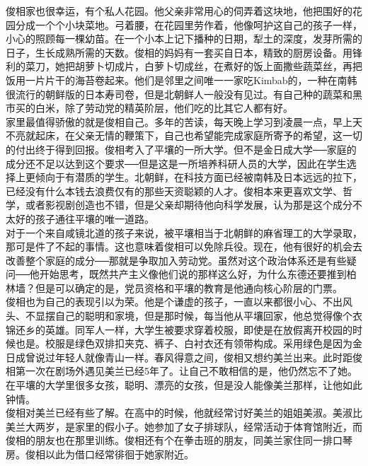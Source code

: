 \begin{multicols}{\theparacolNo}
俊相家也很幸运，有个私人花园。他父亲非常用心的伺弄着这块地，他把围好的花园分成一个个小块菜地。弓着腰，在花园里劳作着，他像呵护这自己的孩子一样，小心的照顾每一棵幼苗。在一个小本上记下播种的日期，犁土的深度，发芽所需的日子，生长成熟所需的天数。俊相的妈妈有一套买自日本，精致的厨房设备。用锋利的菜刀，她把胡萝卜切成片，白萝卜切成丝，在煮好的饭上面撒些蔬菜丝，再把饭用一片片干的海苔卷起来。他们是邻里之间唯一一家吃Kimbab的，一种在南韩很流行的朝鲜版的日本寿司卷，但是北朝鲜人一般没有见过。有自己种的蔬菜和黑市买的白米，除了劳动党的精英阶层，他们吃的比其它人都有好。\\

家里最值得骄傲的就是俊相自己。多年的苦读，每天晚上学习到凌晨一点，早上天不亮就起床，在父亲无情的鞭策下，自己也希望能完成家庭所寄予的希望，这一切的付出终于得到回报。俊相考入了平壤的一所大学。但不是金日成大学──家庭的成分还不足以达到这个要求──但是这是一所培养科研人员的大学，因此在学生选择上更倾向于有潜质的学生。北朝鲜，在科技方面已经被南韩及日本远远的拉下，已经没有什么本钱去浪费仅有的那些天资聪颖的人才。俊相本来更喜欢文学、哲学，或者影视剧创造也不错，但是父亲却期待他向科学发展，认为那是这个成分不太好的孩子通往平壤的唯一道路。\\

对于一个来自咸镜北道的孩子来说，被平壤相当于北朝鲜的麻省理工的大学录取，那可是件了不起的事情。这也意味着俊相可以免除兵役。现在，他有很好的机会去改善整个家庭的成分──那就是争取加入劳动党。虽然对这个政治体系还是有些疑问──他开始思考，既然共产主义像他们说的那样这么好，为什么东德还要推到柏林墙？但是可以确定的是，党员资格和平壤的教育是他通向核心阶层的门票。\\

俊相也为自己的表现引以为荣。他是个谦虚的孩子，一直以来都很小心、不出风头、不显摆自己的聪明和家境，但是那时候，每当他从平壤回家，他总觉得像个衣锦还乡的英雄。同军人一样，大学生被要求穿着校服，即使是在放假离开校园的时候也是。校服是绿色双排扣夹克、裤子、白衬衣还有领带构成。采用绿色是因为金日成曾说过年轻人就像青山一样。春风得意之间，俊相又想约美兰出来。此时距俊相第一次在剧场外遇见美兰已经5年了。让自己不敢相信的是，他仍然忘不了她。在平壤的大学里很多女孩，聪明、漂亮的女孩，但是没人能像美兰那样，让他如此钟情。\\

俊相对美兰已经有些了解。在高中的时候，他就经常讨好美兰的姐姐美淑。美淑比美兰大两岁，是家里的假小子。她参加了女子排球队，经常活动于体育馆附近，而俊相的朋友也在那里训练。俊相还有个在拳击班的朋友，同美兰家住同一排口琴房。俊相以此为借口经常徘徊于她家附近。\\


\end{multicols}

